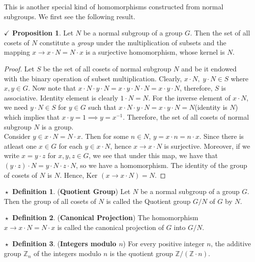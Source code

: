 \documentclass{article}
\theoremstyle{definition}
\newtheorem{definition}{$\boxed{\star}$ Definition}
\theoremstyle{remark}
\theoremstyle{definition}
\theoremstyle{definition}
\newtheorem{proposition}{$\checkmark$ Proposition}
\theoremstyle{definition}
\theoremstyle{proof}
\newcommand{\inv}[1]{#1^{-1}}
\newcommand{\kernel}[0]{\text{Ker }}
\begin{document}
This is another special kind of homomorphisms constructed from normal subgroups. We first see the following result.
\begin{proposition}
	Let $ N $ be a normal subgroup of a group $ G $. Then the set of all cosets of $ N $ constitute a \emph{group} under the multiplication of subsets and the mapping $ x\longrightarrow x\cdot N = N\cdot x $ is a surjective homomorphism, whose kernel is $ N $.
\end{proposition}
\begin{proof}
	Let $ S $ be the set of all cosets of normal subgroup $ N $ and be it endowed with the binary operation of subset multiplication. Clearly, $ x\cdot N,\;y\cdot N \in S $ where $ x,y\in G $. Now note that $ x\cdot N\cdot y\cdot N = x\cdot y\cdot N\cdot N = x\cdot y\cdot N $, therefore, $ S $ is associative. Identity element is clearly $ 1\cdot N = N$. For the inverse element of $ x\cdot N $, we need $ y\cdot N \in S$ for $ y\in G $ such that $ x\cdot N \cdot y\cdot N = x\cdot y \cdot N = N $(identity is $ N $) which implies that $ x\cdot y = 1 \implies y = \inv{x}$. Therefore, the set of all cosets of normal subgroup $ N $ is a group.\\
	Consider $ y\in x\cdot N= N\cdot x $. Then for some $ n\in N $, $ y = x\cdot n = n\cdot x $. Since there is atleast one $ x\in G $ for each $ y\in x\cdot N $, hence $ x\longrightarrow x\cdot N $ is surjective. Moreover, if we write $ x = y\cdot z $ for $ x,y,z\in G $, we see that under this map, we have that $ (y\cdot z )\cdot N = y\cdot N \cdot z\cdot N $, so we have a homomorphism. The identity of the group of cosets of $ N $ is $ N $. Hence, $ \kernel(x\to x\cdot N) = N$.
\end{proof}
\hrulefill
\begin{definition}
	(\textbf{Quotient Group}) Let $ N $ be a normal subgroup of a group $ G $. Then the group of all cosets of $ N $ is called the Quotient group $ G/N $ of $ G $ by $ N $. 
\end{definition}
\begin{definition}
	(\textbf{Canonical Projection}) The homomorphism $ x\longrightarrow x\cdot N = N\cdot x $ is called the canonical projection of $ G $ into $ G/N $.
\end{definition}
\hrulefill
\begin{definition}
	(\textbf{Integers modulo $ n $}) For every positive integer $ n $, the additive group $ \mathbb{Z}_n $ of the integers modulo $ n $ is the quotient group $ \mathbb{Z}/(\mathbb{Z}\cdot n) $.
\end{definition}
\end{document}

